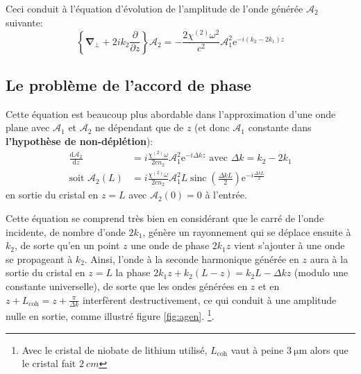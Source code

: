 \documentclass[11pt,a4paper] { article}
\newcommand{\dv}[2]{\frac{\mathrm d #1}{\mathrm d #2}}
\newcommand{\A}{\mathcal A}
\newcommand{\e}[1]{\text{e}^{#1}}
\newcommand{\mathsc}[1]{\mathrm{\scriptscriptstyle {#1}}}
\renewcommand{\v}[1]{\mathbf{#1}}
\begin{document}


Ceci conduit à l'équation d'évolution de l'amplitude de l'onde générée $\A_2$ suivante:
\[ \left\{\v\nabla_\bot + 2 i k_2 \frac{\partial}{\partial z} \right\} \A_2 = - \frac{2 \chi^{(2)} \omega^2}{c^2} \A_1^2 \e{- i (k_2 - 2k_1) z} \]

\subsection{Le problème de l'accord de phase}

Cette équation est beaucoup plus abordable dans l'approximation d'une onde plane avec $\A_1$ et $\A_2$ ne dépendant que de $z$ (et donc $\A_1$ constante dans \textbf{l'hypothèse de non-déplétion}):
\begin{align}
	\dv{\A_2}{z} &= i\frac{\chi^{(2)}\omega}{2cn_2} \A_1^2 \e{-i \Delta k z} \text{ avec } \boxed{\Delta k = k_2 - 2k_1} \label{eq:pwe} \\
	\text{soit } \A_2(L) &= i \frac{\chi^{(2)}\omega}{2 cn_2} \A_1^2 L \operatorname{sinc}\left( \frac{\Delta k L}{2} \right) \e{-i\frac{\Delta k L}{2}}
\end{align}
en sortie du cristal en $z=L$ avec $\A_2(0)=0$ à l'entrée.

Cette équation se comprend très bien en considérant que le carré de l'onde incidente, de nombre d'onde $2k_1$, génère un rayonnement qui se déplace ensuite à $k_2$, de sorte qu'en un point $z$ une onde de phase $2k_1z$ vient s'ajouter à une onde se propageant à $k_2$. Ainsi, l'onde à la seconde harmonique générée en $z$ aura à la sortie du cristal en $z=L$ la phase $2k_1 z + k_2 (L-z) = k_2 L - \Delta k z$ (modulo une constante universelle), de sorte que les ondes générées en $z$ et en $z+L_\mathsc{coh} =z + \frac{\pi}{\Delta k}$ interfèrent destructivement, ce qui conduit à une amplitude nulle en sortie, comme illustré figure \ref{fig:agen}. \footnote{Avec le cristal de niobate de lithium utilisé, $L_\mathsc{coh}$ vaut à peine $\SI{3}{\micro\meter}$ alors que le cristal fait $\SI{2}{cm}$}.
\end{document}
